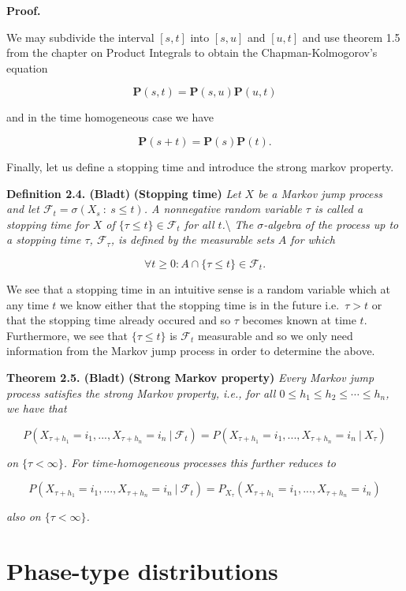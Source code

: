 \documentclass[
]{book}
\begin{document}
\textbf{Proof.}

We may subdivide the interval \([s,t]\) into \([s,u]\) and \([u,t]\) and use theorem 1.5 from the chapter on Product Integrals to obtain the Chapman-Kolmogorov's equation

\[
\mathbf{P}(s,t)=\mathbf{P}(s,u)\mathbf{P}(u,t)
\]

and in the time homogeneous case we have

\[
\mathbf{P}(s+t)=\mathbf{P}(s)\mathbf{P}(t).
\]

Finally, let us define a stopping time and introduce the strong markov property.

\textbf{Definition 2.4. (Bladt)} \textbf{(Stopping time)} \emph{Let \(X\) be a Markov jump process and let \(\mathcal{F}_t=\sigma(X_s\ :\ s\le t)\). A nonnegative random variable \(\tau\) is called a stopping time for \(X\) of \(\{\tau \le t\}\in\mathcal{F}_t\) for all \(t\).}\textbackslash{}
\emph{The \(\sigma\)-algebra of the process up to a stopping time \(\tau\), \(\mathcal{F}_\tau\), is defined by the measurable sets \(A\) for which}

\[
\forall t\ge 0 : A\cap \{\tau\le t\}\in\mathcal{F}_t.
\]

We see that a stopping time in an intuitive sense is a random variable which at any time \(t\) we know either that the stopping time is in the future i.e.~\(\tau > t\) or that the stopping time already occured and so \(\tau\) becomes known at time \(t\). Furthermore, we see that \(\{\tau \le t\}\) is \(\mathcal{F}_t\) measurable and so we only need information from the Markov jump process in order to determine the above.

\textbf{Theorem 2.5. (Bladt)} \textbf{(Strong Markov property)} \emph{Every Markov jump process satisfies the strong Markov property, i.e., for all \(0\le h_1\le h_2\le \cdots \le h_n\), we have that}

\[
P(X_{\tau +h_1}=i_1,...,X_{\tau + h_n}=i_n\ \vert\ \mathcal{F}_t)=P(X_{\tau +h_1}=i_1,...,X_{\tau + h_n}=i_n\ \vert\ X_\tau)
\]

\emph{on \(\{\tau <\infty\}\). For time-homogeneous processes this further reduces to}

\[
P(X_{\tau +h_1}=i_1,...,X_{\tau + h_n}=i_n\ \vert\ \mathcal{F}_t)=P_{X_\tau}(X_{\tau +h_1}=i_1,...,X_{\tau + h_n}=i_n)
\]

\emph{also on \(\{\tau <\infty\}\).}

\hypertarget{phase-type-distributions}{%
\section{Phase-type distributions}\label{phase-type-distributions}}
\end{document}

